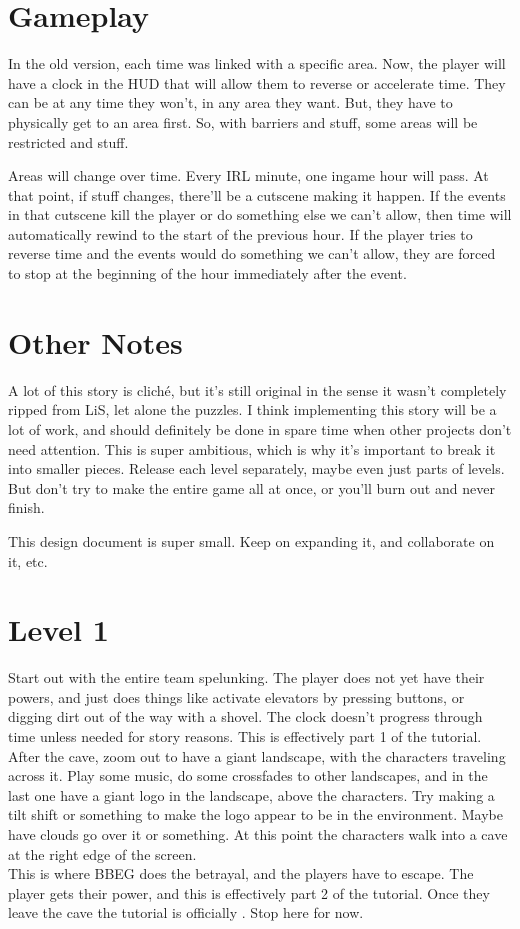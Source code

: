 \documentclass[a4paper,12pt]{article}
\begin{document}
  \section{Gameplay}
  In the old version, each time was linked with a specific area. Now, the player will have a clock in the HUD that will allow them to reverse or accelerate time. They can be at any time they won't, in any area they want. But, they have to physically get to an area first. So, with barriers and stuff, some areas will be restricted and stuff.

  Areas will change over time. Every IRL minute, one ingame hour will pass. At that point, if stuff changes, there'll be a cutscene making it happen. If the events in that cutscene kill the player or do something else we can't allow, then time will automatically rewind to the start of the previous hour. If the player tries to reverse time and the events would do something we can't allow, they are forced to stop at the beginning of the hour immediately after the event.

  \section{Other Notes}
  A lot of this story is clich\'e, but it's still original in the sense it wasn't completely ripped from LiS, let alone the puzzles. I think implementing this story will be a lot of work, and should definitely be done in spare time when other projects don't need attention. This is super ambitious, which is why it's important to break it into smaller pieces. Release each level separately, maybe even just parts of levels. But don't try to make the entire game all at once, or you'll burn out and never finish.

  This design document is super small. Keep on expanding it, and collaborate on it, etc.

  \section{Level 1}
  Start out with the entire team spelunking. The player does not yet have their powers, and just does things like activate elevators by pressing buttons, or digging dirt out of the way with a shovel. The clock doesn't progress through time unless needed for story reasons. This is effectively part 1 of the tutorial.\\

  After  the cave, zoom out to have a giant landscape, with the characters traveling across it. Play some music, do some crossfades to other landscapes, and in the last one have a giant logo in the landscape, above the characters. Try making a tilt shift or something to make the logo appear to be in the environment. Maybe have clouds go over it or something. At this point the characters walk into a cave at the right edge of the screen.\\

  This is where BBEG does the betrayal, and the players have to escape. The player gets their power, and this is effectively part 2 of the tutorial. Once they leave the cave the tutorial is officially . Stop here for now. 
\end{document}
